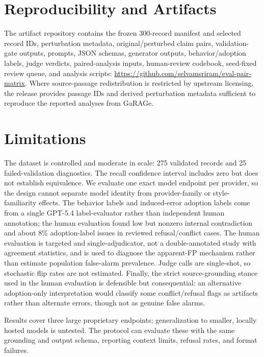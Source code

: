 \section*{Reproducibility and Artifacts}

The artifact repository contains the frozen 300-record manifest and selected record IDs, perturbation metadata, original/perturbed claim pairs, validation-gate outputs, prompts, JSON schemas, generator outputs, behavior/adoption labels, judge verdicts, paired-analysis inputs, human-review codebook, seed-fixed review queue, and analysis scripts: \url{https://github.com/selvamsriram/eval-pair-matrix}. Where source-passage redistribution is restricted by upstream licensing, the release provides passage IDs and derived perturbation metadata sufficient to reproduce the reported analyses from GaRAGe.

\section*{Limitations}

The dataset is controlled and moderate in scale: 275 validated records and 25 failed-validation diagnostics. The recall confidence interval includes zero but does not establish equivalence. We evaluate one exact model endpoint per provider, so the design cannot separate model identity from provider-family or style-familiarity effects. The behavior labels and induced-error adoption labels come from a single GPT-5.4 label-evaluator rather than independent human annotation; the human evaluation found low but nonzero internal contradiction and about 8\% adoption-label issues in reviewed refusal/conflict cases. The human evaluation is targeted and single-adjudicator, not a double-annotated study with agreement statistics, and is used to diagnose the apparent-FP mechanism rather than estimate population false-alarm prevalence. Judge calls are single-shot, so stochastic flip rates are not estimated. Finally, the strict source-grounding stance used in the human evaluation is defensible but consequential: an alternative adoption-only interpretation would classify some conflict/refusal flags as artifacts rather than alternate errors, though not as genuine false alarms.

Results cover three large proprietary endpoints; generalization to smaller, locally hosted models is untested. The protocol can evaluate these with the same grounding and output schema, reporting context limits, refusal rates, and format failures.


